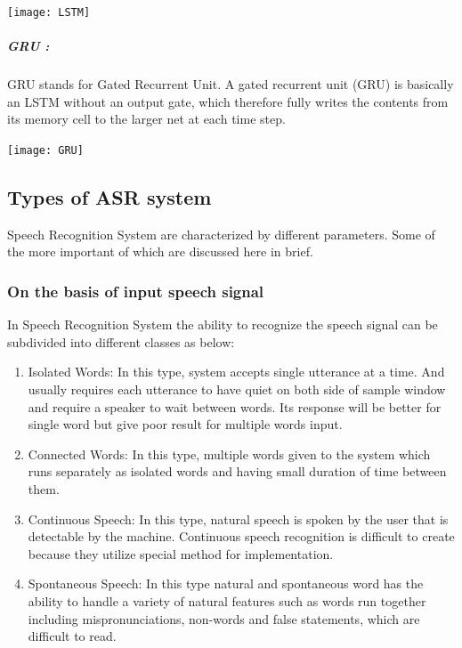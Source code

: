 \begin{minipage}{\linewidth}
	\centering
	\texttt{[image: LSTM]} 
\end{minipage}	

\subparagraph{GRU :} GRU stands for Gated Recurrent Unit. A gated recurrent unit (GRU) is basically an LSTM without an output gate, which therefore fully writes the contents from its memory cell to the larger net at each time step.

\begin{minipage}{\linewidth}
	\centering
	\texttt{[image: GRU]} 
\end{minipage}	

\subsection{Types of ASR system}
Speech Recognition System are characterized by different parameters. Some of the more important of which are discussed here in brief.
\subsubsection{On the basis of input speech signal}
In Speech Recognition System the ability to recognize the speech signal can be subdivided into different classes as below:
\begin{enumerate}
	\item Isolated Words: In this type, system accepts single utterance at a time. And usually requires each utterance to have quiet on both side of sample window and require a speaker to wait between words. Its response will be better for single word but give poor result for multiple words input.
	\item Connected Words: In this type, multiple words given to the system which runs separately as isolated words and having small duration of time between them.
	\item Continuous Speech: In this type, natural speech is spoken by the user that is detectable by the machine. Continuous speech recognition is difficult to create because they utilize special method for implementation.
	\item Spontaneous Speech: In this type natural and spontaneous word has the ability to handle a variety of natural features such as words run together including mispronunciations, non-words and false statements, which are difficult to read.
\end{enumerate}
